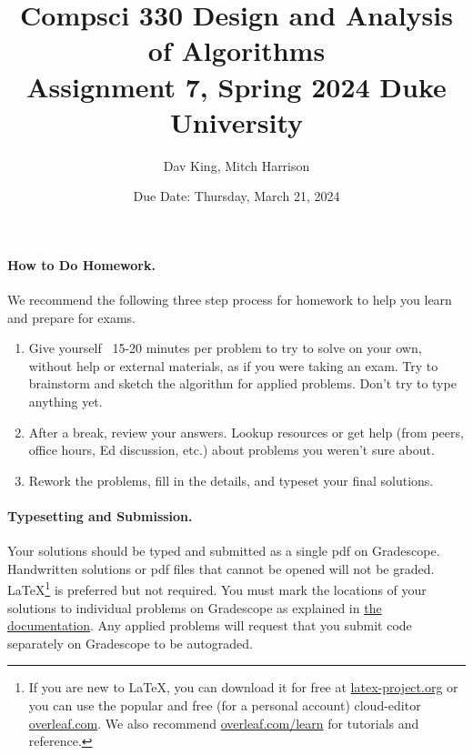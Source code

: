 \documentclass[11pt]{article}
\title{\vspace{-0.5in}Compsci 330 Design and Analysis of Algorithms \\Assignment 7, Spring 2024 Duke University}
\author{Dav King, Mitch Harrison}
\date{Due Date: Thursday, March 21, 2024}
\begin{document}
\maketitle



\paragraph{How to Do Homework.} We recommend the following three step process for homework to help you learn and prepare for exams.
\begin{enumerate}
	\item Give yourself ~15-20 minutes per problem to try to solve on your own, without help or external materials, as if you were taking an exam. Try to brainstorm and sketch the algorithm for applied problems. Don't try to type anything yet.
	\item After a break, review your answers. Lookup resources or get help (from peers, office hours, Ed discussion, etc.) about problems you weren't sure about.
	\item Rework the problems, fill in the details, and typeset your final solutions.
\end{enumerate}

\paragraph{Typesetting and Submission.} Your solutions should be typed and submitted as a single pdf on Gradescope. Handwritten solutions or pdf files that cannot be opened will not be graded. \LaTeX \footnote{If you are new to \LaTeX, you can download it for free at \href{https://www.latex-project.org}{latex-project.org} or you can use the popular and free (for a personal account) cloud-editor \href{https://www.overleaf.com}{overleaf.com}. We also recommend \href{https://www.overleaf.com/learn}{overleaf.com/learn} for tutorials and reference.} is preferred but not required. %
You must mark the locations of your solutions to individual problems on Gradescope as explained in \href{https://help.gradescope.com/article/ccbpppziu9-student-submit-work#submitting_a_pdf}{the documentation}. Any applied problems will request that you submit code separately on Gradescope to be autograded. 
\end{document}
